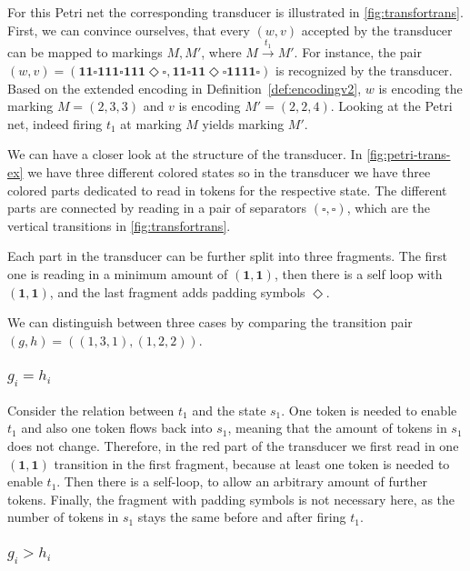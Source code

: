 For this Petri net the corresponding transducer is illustrated in \autoref{fig:transfortrans}. First, we can convince ourselves, that every $(w,v)$ accepted by the transducer can be mapped to markings $M,M'$, where $M \xrightarrow{t_{1}} M'$. For instance, the pair $(w,v) = (\bm{11\square111\square111\Diamond\square},\bm{11\square11\Diamond\square1111\square})$ is recognized by the transducer. Based on the extended encoding in Definition~\autoref{def:encodingv2}, $w$ is encoding the marking $M = (2,3,3)$ and $v$ is encoding $M' = (2,2,4)$. Looking at the Petri net, indeed firing $t_{1}$ at marking $M$ yields marking $M'$.

We can have a closer look at the structure of the transducer. In \autoref{fig:petri-trans-ex} we have three different colored states so in the transducer we have three colored parts dedicated to read in tokens for the respective state. The different parts are connected by reading in a pair of separators $(\square,\square)$, which are the vertical transitions in \autoref{fig:transfortrans}.


Each part in the transducer can be further split into three fragments. The first one is reading in a minimum amount of $(\bm{1},\bm{1})$, then there is a self loop with $(\bm{1},\bm{1})$, and the last fragment adds padding symbols $\Diamond$. 

We can distinguish between three cases by comparing the transition pair $(g,h) = ((1,3,1),(1,2,2))$. 


\subsubsection{$g_{i} = h_{i}$}

Consider the relation between $t_{1}$ and the state $s_{1}$. One token is needed to enable $t_{1}$ and also one token flows back into $s_{1}$, meaning that the amount of tokens in $s_{1}$ does not change. 
Therefore, in the red part of the  transducer we first read in one $(\bm{1},\bm{1})$ transition in the first fragment, because at least one token is needed to enable $t_{1}$. Then there is a self-loop, to allow an arbitrary amount of further tokens. Finally, the fragment with padding symbols is not necessary here, as the number of tokens in $s_{1}$ stays the same before and after firing $t_{1}$.

\subsubsection{$g_{i} > h_{i}$}

